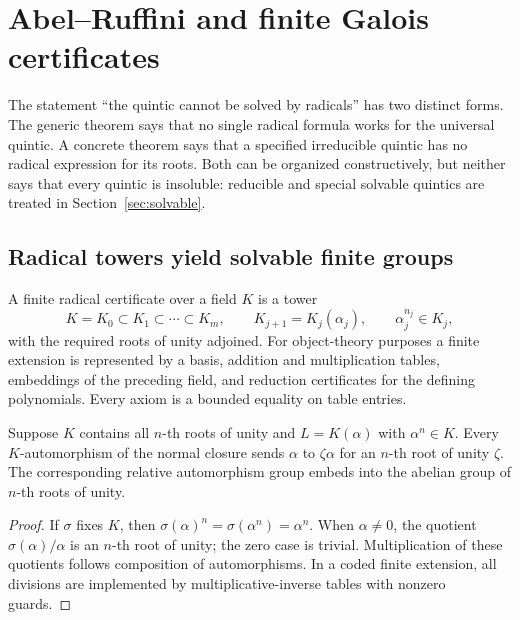 \section{Abel--Ruffini and finite Galois certificates}\label{sec:abel-ruffini}

The statement ``the quintic cannot be solved by radicals'' has two distinct
forms.  The generic theorem says that no single radical formula works for the
universal quintic.  A concrete theorem says that a specified irreducible
quintic has no radical expression for its roots.  Both can be organized
constructively, but neither says that every quintic is insoluble: reducible and
special solvable quintics are treated in Section~\ref{sec:solvable}.

\subsection{Radical towers yield solvable finite groups}

A finite radical certificate over a field \(K\) is a tower
\begin{equation}\label{eq:radical-tower}
 K=K_0\subset K_1\subset\cdots\subset K_m,
 \qquad K_{j+1}=K_j(\alpha_j),
 \qquad \alpha_j^{n_j}\in K_j,
\end{equation}
with the required roots of unity adjoined.  For object-theory purposes a finite
extension is represented by a basis, addition and multiplication tables,
embeddings of the preceding field, and reduction certificates for the defining
polynomials.  Every axiom is a bounded equality on table entries.

\begin{lemma}\label{lem:kummer-step}
Suppose \(K\) contains all \(n\)-th roots of unity and
\(L=K(\alpha)\) with \(\alpha^n\in K\).  Every \(K\)-automorphism of the normal
closure sends \(\alpha\) to \(\zeta\alpha\) for an \(n\)-th root of unity
\(\zeta\).  The corresponding relative automorphism group embeds into the
abelian group of \(n\)-th roots of unity.
\end{lemma}

\begin{proof}
If \(\sigma\) fixes \(K\), then
\(\sigma(\alpha)^n=\sigma(\alpha^n)=\alpha^n\).  When \(\alpha\ne0\), the
quotient \(\sigma(\alpha)/\alpha\) is an \(n\)-th root of unity; the zero case
is trivial.  Multiplication of these quotients follows composition of
automorphisms.  In a coded finite extension, all divisions are implemented by
multiplicative-inverse tables with nonzero guards.
\end{proof}

